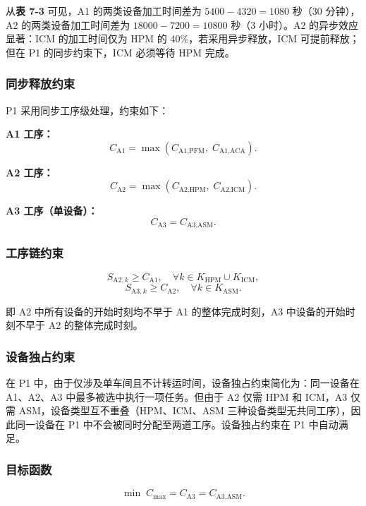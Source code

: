 \documentclass[UTF8,a4paper,12pt]{ctexart}
\begin{document}
从\textbf{表 7-3} 可见，A1 的两类设备加工时间差为 $5400 - 4320 = 1080$ 秒（30 分钟），A2 的两类设备加工时间差为 $18000 - 7200 = 10800$ 秒（3 小时）。A2 的异步效应显著：ICM 的加工时间仅为 HPM 的 40\%，若采用异步释放，ICM 可提前释放；但在 P1 的同步约束下，ICM 必须等待 HPM 完成。

\subsubsection{同步释放约束}
P1 采用同步工序级处理，约束如下：

\textbf{A1 工序：}
\begin{equation}
C_{\text{A1}} = \max(C_{\text{A1},\text{PFM}}, \; C_{\text{A1},\text{ACA}}).
\end{equation}

\textbf{A2 工序：}
\begin{equation}
C_{\text{A2}} = \max(C_{\text{A2},\text{HPM}}, \; C_{\text{A2},\text{ICM}}).
\end{equation}

\textbf{A3 工序（单设备）：}
\begin{equation}
C_{\text{A3}} = C_{\text{A3},\text{ASM}}.
\end{equation}

\subsubsection{工序链约束}
\begin{equation}
S_{\text{A2},k} \geq C_{\text{A1}}, \quad \forall k \in K_{\text{HPM}} \cup K_{\text{ICM}},
\end{equation}
\begin{equation}
S_{\text{A3},k} \geq C_{\text{A2}}, \quad \forall k \in K_{\text{ASM}}.
\end{equation}

即 A2 中所有设备的开始时刻均不早于 A1 的整体完成时刻，A3 中设备的开始时刻不早于 A2 的整体完成时刻。

\subsubsection{设备独占约束}
在 P1 中，由于仅涉及单车间且不计转运时间，设备独占约束简化为：同一设备在 A1、A2、A3 中最多被选中执行一项任务。但由于 A2 仅需 HPM 和 ICM，A3 仅需 ASM，设备类型互不重叠（HPM、ICM、ASM 三种设备类型无共同工序），因此同一设备在 P1 中不会被同时分配至两道工序。设备独占约束在 P1 中自动满足。

\subsubsection{目标函数}
\begin{equation}
\min \; C_{\max} = C_{\text{A3}} = C_{\text{A3},\text{ASM}}.
\end{equation}
\end{document}
